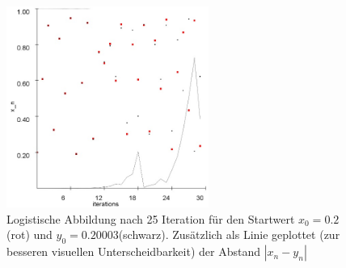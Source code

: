 \documentclass[12pt,a4paper]{article}
\begin{document}
\begin{figure}[!htbp]
	\centering
	\includegraphics[width=250px]{logi/kore}
	\caption{Logistische Abbildung nach 25 Iteration für den Startwert $x_0=0.2$ (rot) und $y_0=0.20003$(schwarz). Zusätzlich als Linie geplottet (zur besseren visuellen Unterscheidbarkeit) der Abstand $|x_n-y_n|$}
	\label{fig:kore}
\end{figure}
\end{document}
